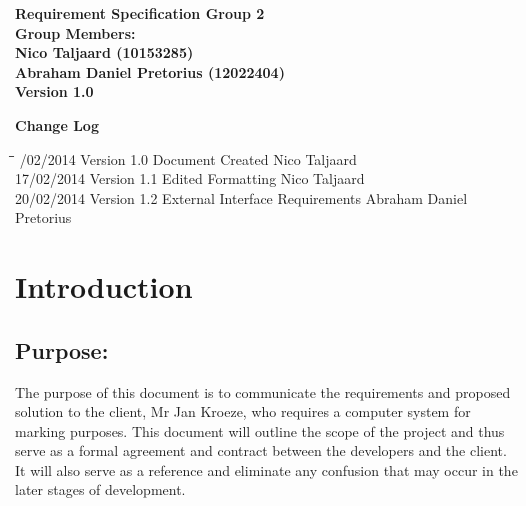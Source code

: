 \documentclass[12pt]{article}
\newcommand{\Title}{Requirement Specification} %
\begin{document}
\vspace{4em}

\begin{center}%

  \LARGE \bf \Title
  \LARGE {\bf Group 2}\\[2em]
  \LARGE {\bf Group Members:}\\[1em]
  \large
      Nico Taljaard			(10153285)\\[6em]
      Abraham Daniel Pretorius        (12022404)\\[6em]
      {\bf Version 1.0}
    
\end{center}%

\newpage
	{\LARGE \bf Change Log}\\[2em]
	
	\begin{tabbing}
		\hspace*{3cm}\=\hspace*{3cm}\=\hspace*{8cm}\=\hspace*{3cm} /02/2014 \> Version 1.0 \> Document Created \> Nico Taljaard\\
		17/02/2014 \> Version 1.1 \> Edited Formatting \> Nico Taljaard\\
		20/02/2014 \> Version 1.2 \> External Interface Requirements \> Abraham Daniel Pretorius  \\
	\end{tabbing}

\newpage
	\tableofcontents	
	
\newpage
	\section{Introduction}
	
	\vspace{0.2in}

		\subsection{Purpose:} %
		\vspace{0.1in}
		The purpose of this document is to communicate the requirements and proposed solution to the client, Mr Jan Kroeze, who requires a computer system for marking purposes. This document will outline the scope of the project and thus serve as a formal agreement and contract between the developers and the client. It will also serve as a reference and eliminate any confusion that may occur in the later stages of development. 
	
\end{document}
